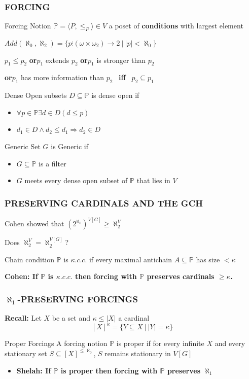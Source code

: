 \documentclass{beamer}
\begin{document}
\begin{frame}
\frametitle{FORCING}
\begin{block}{Forcing Notion}
$\mathbb{P}= \langle P, \leq_P \rangle \in V$ a poset of \textbf{conditions} with largest element

\hspace{20mm}$Add(\aleph_0, \aleph_2)= \{p \vdots (\omega \times \omega_2) \longrightarrow 2 \ | \ |p| < \aleph_0\}$

$p_1 \leq p_2$ \quad \textbf{{\large or}}\quad $p_1$ extends $p_2$ \quad \textbf{{\large or}}\quad $p_1$ is stronger than $p_2$

\textbf{{\large or}}\quad $p_1$ has more information than $p_2$ \ \textbf{{\large iff}} \ $p_2 \subseteq p_1$
\end{block}
\vspace{-2mm}
\begin{block}{Dense Open subsets}
$D \subseteq \mathbb{P}$ is dense open if
\begin{itemize}
\item $\forall p \in \mathbb{P} \exists d \in D (d \leq p)$
\item $d_1 \in D \land d_2 \leq d_1 \Rightarrow d_2 \in D$
\end{itemize}
\end{block}
\vspace{-2mm}
\begin{block}{Generic Set}
$G$ is Generic if
\begin{itemize}
	\item $G \subseteq \mathbb{P}$ is a filter
	\item $G$ meets every dense open subset of $\mathbb{P}$ that lies in $V$
\end{itemize}
\end{block}
\end{frame}
\begin{frame}
\frametitle{PRESERVING CARDINALS AND THE GCH}
Cohen showed that $(2^{\aleph_0})^{V[G]} \geq \aleph_2^{V}$

Does $\aleph_2^{V} = \aleph_2^{V[G]}$?
\pause
\begin{block}{Chain condition}
$\mathbb{P}$ is $\kappa.c.c.$ if every maximal antichain $A \subseteq \mathbb{P}$ has size $<\kappa$

\textbf{Cohen: If $\mathbb{P}$ is $\kappa.c.c.$ then forcing with $\mathbb{P}$ preserves cardinals $\geq \kappa$.}
\end{block}
\end{frame}
\begin{frame}
\frametitle{$\aleph_1$-PRESERVING FORCINGS}
\textbf{Recall: }Let $X$ be a set and $\kappa \leq |X|$ a cardinal
$$[X]^{\kappa}=\{Y \subseteq X \ | \ |Y|= \kappa\}$$
\begin{block}{Proper Forcings}
A forcing notion $\mathbb{P}$ is proper if for every infinite $X$ and every stationary set $S \subseteq [X]^{\leq \aleph_0}$, $S$ remains stationary in $V[G]$
\begin{itemize}
\item \textbf{Shelah: If $\mathbb{P}$ is proper then forcing with $\mathbb{P}$ preserves $\aleph_1$}
\end{itemize}
\end{block}
\end{frame}
\end{document}
